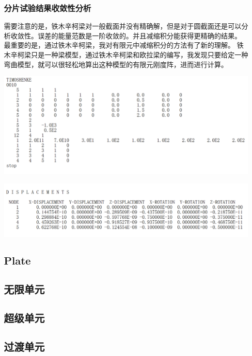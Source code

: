 \documentclass[UTF8]{ctexbook}
\begin{document}
\subsubsection{分片试验结果收敛性分析}
需要注意的是，铁木辛柯梁对一般截面并没有精确解，但是对于圆截面还是可以分析收敛性。误差的能量范数是一阶收敛的。并且减缩积分能获得更精确的结果。
最重要的是，通过铁木辛柯梁，我对有限元中减缩积分的方法有了新的理解。
铁木辛柯梁只是一种梁模型，通过铁木辛柯梁和欧拉梁的编写，我发现只要给定一种弯曲模型，就可以很轻松地算出这种模型的有限元刚度阵，进而进行计算。
\begin{center}
\includegraphics[width=1.0\textwidth]{timoshenko2.png}
\end{center}
\begin{center}
\includegraphics[width=1.0\textwidth]{timoshenko3.png}
\end{center}
\subsection{Plate}

\subsection{无限单元}

\subsection{超级单元}

\subsection{过渡单元}
\end{document}

